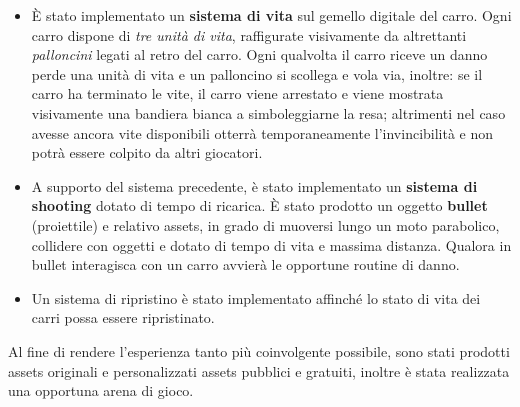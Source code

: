 \begin{itemize}
	\item È stato implementato un \textbf{sistema di vita} sul gemello digitale del carro. Ogni carro dispone di \textit{tre unità di vita}, raffigurate visivamente da altrettanti \textit{palloncini} legati al retro del carro. Ogni qualvolta il carro riceve un danno perde una unità di vita e un palloncino si scollega e vola via, inoltre: se il carro ha terminato le vite, il carro viene arrestato e viene mostrata visivamente una bandiera bianca a simboleggiarne la resa; altrimenti nel caso avesse ancora vite disponibili otterrà temporaneamente l'invincibilità e non potrà essere colpito da altri giocatori.
	\item A supporto del sistema precedente, è stato implementato un \textbf{sistema di shooting} dotato di tempo di ricarica. È stato prodotto un oggetto \textbf{bullet} (proiettile) e relativo assets, in grado di muoversi lungo un moto parabolico, collidere con oggetti e dotato di tempo di vita e massima distanza. Qualora in bullet interagisca con un carro avvierà le opportune routine di danno.
	\item Un sistema di ripristino è stato implementato affinché lo stato di vita dei carri possa essere ripristinato.
\end{itemize}

Al fine di rendere l'esperienza tanto più coinvolgente possibile, sono stati prodotti assets originali e personalizzati assets pubblici e gratuiti, inoltre è stata realizzata una opportuna arena di gioco.
